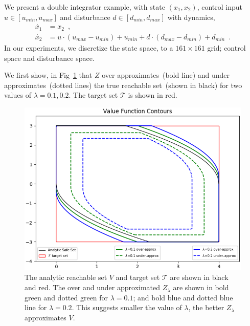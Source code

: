 
We present a double integrator example, with state $(x_1, x_2)$, control input ${u \in [u_{min}, u_{max}]}$ and disturbance ${d \in [d_{min}, d_{max}]}$ with dynamics,
\begin{equation}
\begin{split}
\dot{x_1} & = x_2 \enspace,\\
\dot{x_2} & = u \cdot(u_{max}-u_{min}) + u_{min} + d \cdot (d_{max}-d_{min}) + d_{min}\enspace.
\end{split}
\end{equation}
In our experiments, we discretize the state space, to a $161 \times 161$ grid; control space and disturbance space. 

We first show, in Fig~\ref{fig:convergence} that $Z$ over approximates~(bold line) and under approximates~(dotted lines) the true reachable set~(shown in black) for two values of $\lambda = 0.1, 0.2$. The target set $\mathcal{T}$ is shown in red. 
\begin{figure}
\includegraphics[scale=0.5]{convergence_difflambda.png}
\caption{The analytic reachable set $V$ and target set $\mathcal{T}$ are shown in black and red. The over and under approximated $Z_{\lambda}$ are shown in bold green and dotted green for $\lambda=0.1$; and bold blue and dotted blue line for $\lambda  = 0.2$. This suggests smaller the value of $\lambda$, the better $Z_{\lambda}$ approximates $V$.}
\label{fig:convergence}
\end{figure}

